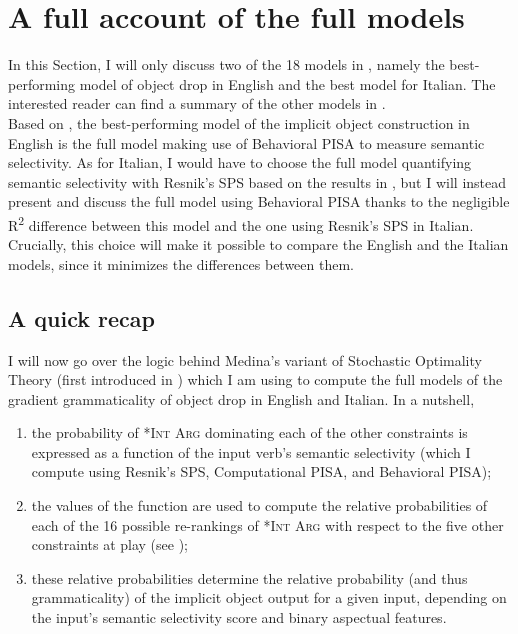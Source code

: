 \section{A full account of the full models} 
In this Section, I will only discuss two of the 18 models in , namely the best-performing model of object drop in English and the best model for Italian. The interested reader can find a summary of the other models in .\\ %
Based on , the best-performing model of the implicit object construction in English is the full model making use of Behavioral PISA to measure semantic selectivity. As for Italian, I would have to choose the full model quantifying semantic selectivity with Resnik's SPS based on the results in , but I will instead present and discuss the full model using Behavioral PISA thanks to the negligible R\textsuperscript{2} difference between this model and the one using Resnik's SPS in Italian. Crucially, this choice will make it possible to compare the English and the Italian models, since it minimizes the differences between them.


\subsection{A quick recap} 

I will now go over the logic behind Medina's variant of Stochastic Optimality Theory (first introduced in ) which I am using to compute the full models of the gradient grammaticality of object drop in English and Italian. In a nutshell,

\begin{enumerate}
    \item the probability of \textsc{*Int Arg} dominating each of the other constraints is expressed as a function of the input verb's semantic selectivity (which I compute using Resnik's SPS, Computational PISA, and Behavioral PISA);
    \item the values of the function are used to compute the relative probabilities of each of the 16 possible re-rankings of \textsc{*Int Arg} with respect to the five other constraints at play (see );
    \item these relative probabilities determine the relative probability (and thus grammaticality) of the implicit object output for a given input, depending on the input's semantic selectivity score and binary aspectual features.
\end{enumerate}

